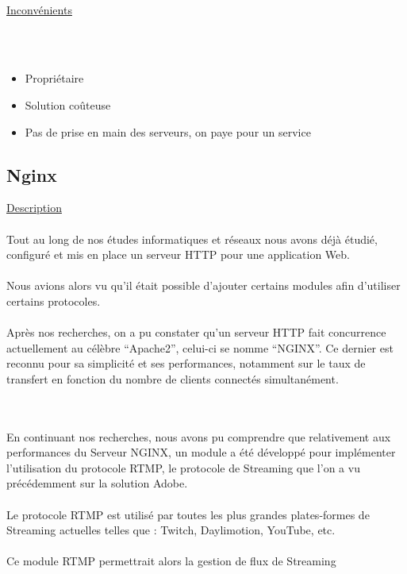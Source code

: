 \documentclass{report}
\begin{document}
    \\    
    \underline{Inconvénients}
    
    \\
    \\
    \begin{itemize}
    \item Propriétaire
    \item Solution coûteuse
    \item Pas de prise en main des serveurs, on paye pour un service
    \end{itemize}
    
        \subsection{Nginx}
    
        
    \underline{Description}
    \\
    
    \\
    Tout au long de nos études informatiques et réseaux nous avons déjà étudié, configuré et mis en place un serveur HTTP pour une application Web.
    \\
    \\
    Nous avions alors vu qu’il était possible d’ajouter certains modules afin d’utiliser certains protocoles.
    \\
    \\
    Après nos recherches, on a pu constater qu’un serveur HTTP fait concurrence actuellement au célèbre “Apache2”, celui-ci se nomme “NGINX”. Ce dernier est reconnu pour sa simplicité et ses performances, notamment sur le taux de transfert en fonction du nombre de clients connectés simultanément.
    \\
    \\
        \hfill{\\}


    En continuant nos recherches, nous avons pu comprendre que relativement aux performances du Serveur NGINX, un module a été développé pour implémenter l’utilisation du protocole RTMP, le protocole de Streaming que l’on a vu précédemment sur la solution Adobe.
    \\
    \\
    Le protocole RTMP est utilisé par toutes les plus grandes plates-formes de Streaming actuelles telles que : Twitch, Daylimotion, YouTube, etc.
    \\
    \\
    Ce module RTMP permettrait alors la gestion de flux de Streaming
    \\
   
\end{document}
